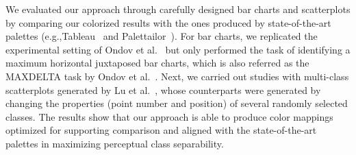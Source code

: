 
We evaluated our approach through carefully designed bar charts and scatterplots by comparing our colorized results with the ones produced by state-of-the-art palettes (e.g.,Tableau~\cite{tableau} and Palettailor~\cite{Lu21}). For bar charts, we replicated the experimental setting of Ondov et al.~\cite{Ondov19} but only performed the task of identifying a maximum  horizontal juxtaposed bar charts, which is also referred as the MAXDELTA task by Ondov et al.~\cite{Ondov19}.
Next, we carried out studies with multi-class scatterplots generated by Lu et al.~\cite{Lu21}, whose counterparts were generated by changing the properties (point number and position) of several randomly selected classes.
The results show that our approach is able to produce color mappings optimized for supporting comparison and aligned with the state-of-the-art palettes in maximizing perceptual class separability.

